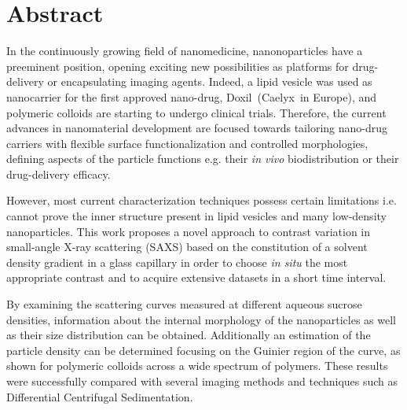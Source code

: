 \chapter*{Abstract}
\thispagestyle{empty}


In the continuously growing field of nanomedicine, nanonoparticles have a preeminent position, opening exciting new possibilities as platforms for drug-delivery or encapsulating imaging agents. Indeed, a lipid vesicle was used as nanocarrier for the first approved nano-drug, Doxil\textregistered\ (Caelyx\textregistered\ in Europe), and polymeric colloids are starting to undergo clinical trials. Therefore, the current advances in nanomaterial development are focused towards tailoring nano-drug carriers with flexible surface functionalization and controlled morphologies, defining aspects of the particle functions e.g. their \emph{in vivo} biodistribution or their drug-delivery efficacy. 

However, most current characterization techniques possess certain limitations i.e. cannot prove the inner structure present in lipid vesicles and many low-density nanoparticles. This work proposes a novel approach to contrast variation in small-angle X-ray scattering (SAXS) based on the constitution of a solvent density gradient in a glass capillary in order to choose \emph{in situ} the most appropriate contrast and to acquire extensive datasets in a short time interval.


By examining the scattering curves measured at different aqueous sucrose densities, information about the internal morphology of the nanoparticles as well as their size distribution can be obtained. Additionally an estimation of the particle density can be determined focusing on the Guinier region of the curve, as shown for polymeric colloids across a wide spectrum of polymers. These results were successfully compared with several imaging methods and techniques such as Differential Centrifugal Sedimentation.
 

